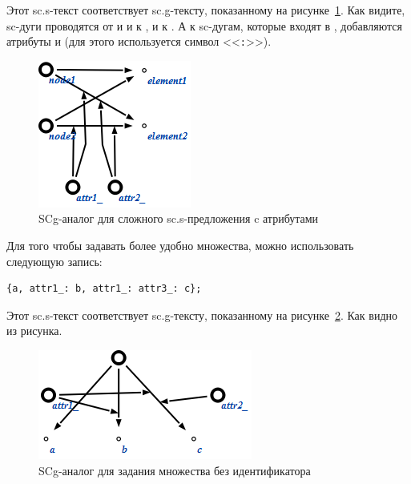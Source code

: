 Этот sc.s-текст соответствует sc.g-тексту, показанному на
рисунке~\ref{fig:SCs_sentence_with_attrs}. Как видите, sc-дуги
проводятся от  и  и к , и к
. А к sc-дугам, которые входят в ,
добавляются атрибуты  и  (для этого
используется символ <<\texttt{:}>>).

\begin{figure}[h!]
  \centering
  \includegraphics{images/5/scs/sentence_with_attrs}
  \caption{SCg-аналог для сложного sc.s-предложения c атрибутами}
  \label{fig:SCs_sentence_with_attrs}
\end{figure}

Для того чтобы задавать более удобно множества, можно использовать
следующую запись:
\begin{verbatim}
{a, attr1_: b, attr1_: attr3_: c};
\end{verbatim}

Этот sc.s-текст соответствует sc.g-тексту, показанному на
рисунке~\ref{fig:SCs_set}. Как видно из рисунка.

\begin{figure}[h!]
  \centering
  \includegraphics{images/5/scs/set}
  \caption{SCg-аналог для задания множества без идентификатора}
  \label{fig:SCs_set}
\end{figure}

